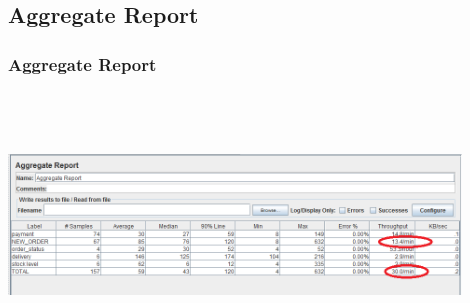 \documentclass[12pt]{beamer}
\begin{document}
\subsection{Aggregate Report}
\begin{frame}[c]
\frametitle{Aggregate Report}
\centering
   \includegraphics[width=12cm, height=7cm]{images/aggregate}

\end{frame}

\end{document}
